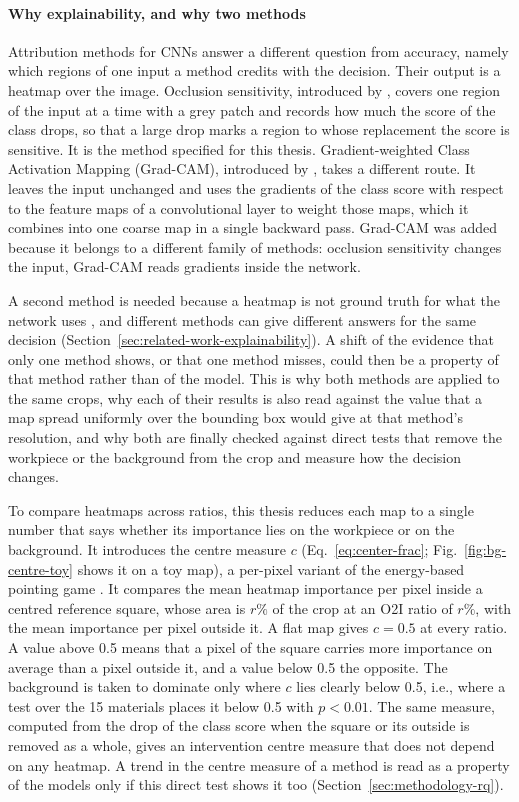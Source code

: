 \paragraph{Why explainability, and why two methods}
Attribution methods for CNNs answer a different question from accuracy, namely which
regions of one input a method credits with the decision. Their output is a heatmap over
the image. Occlusion sensitivity, introduced by \citet{zeilerFergus2014}, covers one region of the input at a time with a grey
patch and records how much the score of the class drops, so that a large drop marks a
region to whose replacement the score is sensitive. It is the method specified for this thesis. Gradient-weighted
Class Activation Mapping (Grad-CAM), introduced by \citet{selvaraju2017gradcam}, takes a different route. It leaves the input unchanged
and uses the gradients of the class score with respect to the feature maps of a
convolutional layer to weight those maps, which it combines into one coarse map in a
single backward pass. Grad-CAM was added because it belongs to a different family of
methods: occlusion sensitivity changes the input, Grad-CAM reads gradients inside the
network.

A second method is needed because a heatmap is not ground truth for what the network
uses \citep{adebayo2018sanity}, and different methods can give different answers for
the same decision (Section~\ref{sec:related-work-explainability}). A shift of the
evidence that only one method shows, or that one method misses, could then be a property
of that method rather than of the model. This is why both methods are applied to the
same crops, why each of their results is also read against the value that a map spread uniformly
over the bounding box would give at that method's resolution, and why both are finally checked against direct tests that remove
the workpiece or the background from the crop and measure how the decision changes.

To compare heatmaps across ratios, this thesis reduces each map to a single number that
says whether its importance lies on the workpiece or on the background. It introduces
the centre measure $c$ (Eq.~\eqref{eq:center-frac}; Fig.~\ref{fig:bg-centre-toy} shows
it on a toy map), a per-pixel variant of the energy-based pointing
game \citep{wang2020scorecam}. It compares the mean heatmap importance
per pixel inside a centred reference square, whose area is $r\%$ of the crop at an O2I
ratio of $r\%$, with the mean importance per pixel outside it. A flat map gives $c =
0.5$ at every ratio. A value above 0.5 means that a pixel of the square carries more
importance on average than a pixel outside it, and a value below 0.5 the opposite. The
background is taken to dominate only where $c$ lies clearly below 0.5, i.e., where a
test over the 15 materials places it below 0.5 with $p < 0.01$. The same measure,
computed from the drop of the class score when the square or its outside is removed as a
whole, gives an intervention centre measure that does not depend on any heatmap. A trend
in the centre measure of a method is read as a property of the models only if this
direct test shows it too (Section~\ref{sec:methodology-rq}).

